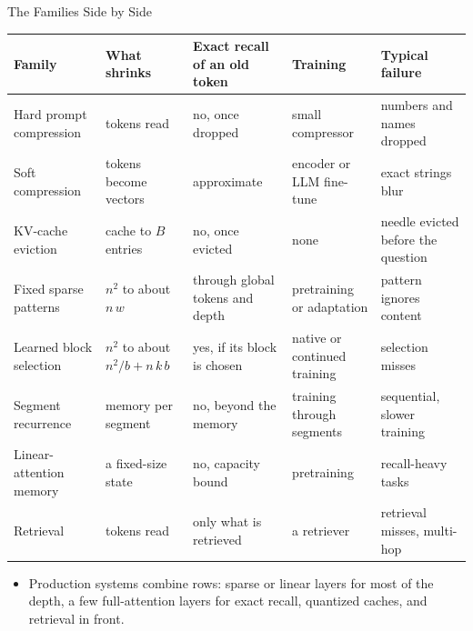 \begin{frame}{The Families Side by Side}
  \centering
  {\scriptsize
  \begin{tabular}{>{\raggedright\arraybackslash}p{2.5cm} >{\raggedright\arraybackslash}p{2.1cm} >{\raggedright\arraybackslash}p{2.4cm} >{\raggedright\arraybackslash}p{2.0cm} >{\raggedright\arraybackslash}p{2.7cm}}
    \toprule
    \textbf{Family} & \textbf{What shrinks} & \textbf{Exact recall of an old token} & \textbf{Training} & \textbf{Typical failure} \\
    \midrule
    Hard prompt compression & tokens read & no, once dropped & small compressor & numbers and names dropped \\
    \addlinespace[0.15em]
    Soft compression & tokens become vectors & approximate & encoder or LLM fine-tune & exact strings blur \\
    \addlinespace[0.15em]
    KV-cache eviction & cache to $B$ entries & no, once evicted & none & needle evicted before the question \\
    \addlinespace[0.15em]
    Fixed sparse patterns & $n^2$ to about $n\,w$ & through global tokens and depth & pretraining or adaptation & pattern ignores content \\
    \addlinespace[0.15em]
    Learned block selection & $n^2$ to about $n^2/b + n\,k\,b$ & yes, if its block is chosen & native or continued training & selection misses \\
    \addlinespace[0.15em]
    Segment recurrence & memory per segment & no, beyond the memory & training through segments & sequential, slower training \\
    \addlinespace[0.15em]
    Linear-attention memory & a fixed-size state & no, capacity bound & pretraining & recall-heavy tasks \\
    \addlinespace[0.15em]
    Retrieval & tokens read & only what is retrieved & a retriever & retrieval misses, multi-hop \\
    \bottomrule
  \end{tabular}\par}
  \vspace{0.6em}
  \begin{itemize}\footnotesize
    \item[\textcolor{red}{$\blacktriangleright$}] Production systems combine rows: sparse or linear layers for most of the depth, a few full-attention layers for exact recall, quantized caches, and retrieval in front.
  \end{itemize}
\end{frame}

